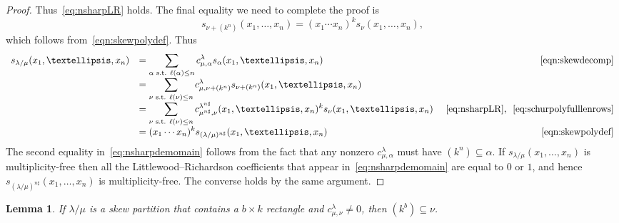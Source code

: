\documentclass[10pt]{article}
\newtheorem{lemma}[theorem]{Lemma}
\theoremstyle{definition}
\newcommand{\nsharp}{n\sharp}%
\begin{document}
\begin{proof}
Thus~\eqref{eq:nsharpLR} holds. The final equality we need to complete the proof is
\begin{equation}
\label{eq:schurpolyfulllenrows}
s_{\nu + (k^n)}(x_1,\ldots,x_n) = (x_1 \cdots x_n)^k s_{\nu}(x_1,\ldots,x_n),
\end{equation}
which follows from~\eqref{eqn:skewpolydef}. Thus
\begin{equation}
\begin{array}{rlr}
\label{eq:nsharpdemomain}
s_{\lambda / \mu}(x_1,\ldots,x_n) & = \displaystyle \sum_{\alpha \text{ s.t. }\ell(\alpha) \leq n} c_{\mu, \alpha}^{\lambda} s_{\alpha}(x_1,\ldots,x_n) &~\eqref{eqn:skewdecomp}\\
& = \displaystyle \sum_{\nu\text{ s.t. }\ell(\nu) \leq n} c_{\mu, \nu + (k^n)}^{\lambda} s_{\nu + (k^n)}(x_1,\ldots,x_n) & \\
& = \displaystyle \sum_{\nu\text{ s.t. }\ell(\nu) \leq n} c_{\mu^{n\sharp}, \nu}^{\lambda^{n\sharp}} (x_1,\ldots,x_n)^k s_{\nu}(x_1,\ldots,x_n) &~\eqref{eq:nsharpLR}\text{, }~\eqref{eq:schurpolyfulllenrows}\\
& = \displaystyle (x_1 \cdots x_n)^k s_{(\lambda / \mu)^{\nsharp }}(x_1,\ldots,x_n) &~\eqref{eqn:skewpolydef}\\
\end{array}
\end{equation}
The second equality in~\eqref{eq:nsharpdemomain} follows from the fact that any nonzero $c_{\mu, \alpha}^{\lambda}$ must have $(k^n) \subseteq \alpha$. If $s_{\lambda / \mu}(x_1,\ldots,x_n)$ is multiplicity-free then all the Littlewood--Richardson coefficients that appear in~\eqref{eq:nsharpdemomain} are equal to $0$ or $1$, and hence $s_{(\lambda / \mu)^{\nsharp }}(x_1,\ldots,x_n)$ is multiplicity-free. The converse holds by the same argument.
\end{proof}
\begin{lemma}
\label{lemma:rectanglecontent}
If $\lambda / \mu$ is a skew partition that contains a $b \times k$ rectangle and $c_{\mu, \nu}^{\lambda} \neq 0$, then $(k^b) \subseteq \nu$.
\end{lemma}
\end{document}
